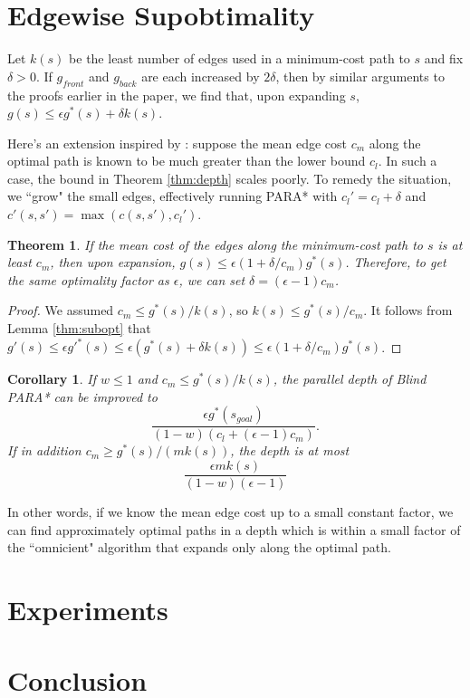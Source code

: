 \documentclass[letterpaper]{article}
\newtheorem{thm}{Theorem}
\newtheorem{cor}{Corollary}
\begin{document}
\section{Edgewise Supobtimality}

Let $k(s)$ be the least number of edges used in a minimum-cost path to $s$ and fix $\delta > 0$. If $g_{front}$ and $g_{back}$ are each increased by $2\delta$, then by similar arguments to the proofs earlier in the paper, we find that, upon expanding $s$, $g(s) \le \epsilon g^*(s) + \delta k(s)$.

Here's an extension inspired by \cite{klein1997randomized}: suppose the mean edge cost $c_m$ along the optimal path is known to be much greater than the lower bound $c_l$. In such a case, the bound in Theorem \ref{thm:depth} scales poorly. To remedy the situation, we ``grow" the small edges, effectively running PARA* with $c_l' = c_l + \delta$ and $c'(s,s') = \max(c(s,s'), c_l')$.

\begin{thm}
\label{thm:delta}
If the mean cost of the edges along the minimum-cost path to $s$ is at least $c_m$, then upon expansion, $g(s) \le \epsilon(1+\delta/c_m)g^*(s)$. Therefore, to get the same optimality factor as $\epsilon$, we can set $\delta = (\epsilon-1)c_m$.
\end{thm}

\begin{proof}
We assumed $c_m \le g^*(s) / k(s)$, so $k(s) \le g^*(s) / c_m$.
It follows from Lemma \ref{thm:subopt} that $g'(s) \le \epsilon g'^*(s) \le \epsilon(g^*(s) + \delta k(s)) \le \epsilon(1+\delta/c_m)g^*(s)$.
\end{proof}

\begin{cor}
\label{cor:delta}
If $w \le 1$ and $c_m \le g^*(s) / k(s)$, the parallel depth of Blind PARA* can be improved to
\[\frac{\epsilon g^*(s_{goal})}{(1-w)(c_l+(\epsilon-1)c_m)}.\]
If in addition $c_m \ge g^*(s)/(mk(s))$, the depth is at most
\[\frac{\epsilon mk(s)}{(1-w)(\epsilon-1)}\]
\end{cor}

In other words, if we know the mean edge cost up to a small constant factor, we can find approximately optimal paths in a depth which is within a small factor of the ``omnicient" algorithm that expands only along the optimal path.

\section{Experiments}

\section{Conclusion}



\end{document}
